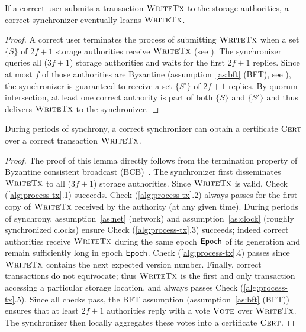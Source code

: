 \begin{lemma}[\tx Availability] \label{th:synchronizer-learns-tx}
    If a correct user submits a transaction $\textsc{WriteTx}$ to the storage authorities, a correct synchronizer eventually learns $\textsc{WriteTx}$.
\end{lemma}
\begin{proof}
    A correct user terminates the process of submitting $\textsc{WriteTx}$ when a set $\{S\}$ of $2f+1$ storage authorities receive $\textsc{WriteTx}$ (see ).
    The synchronizer queries all ($3f+1$) storage authorities and waits for the first $2f+1$ replies. Since at most $f$ of those authorities are Byzantine (assumption~\ref{as:bft} (BFT), see ), the synchronizer is guaranteed to receive a set $\{S'\}$ of $2f+1$ replies.
    By quorum intersection, at least one correct authority is part of both $\{S\}$ and $\{S'\}$ and thus delivers $\textsc{WriteTx}$ to the synchronizer.
\end{proof}

\begin{lemma} \label{th:synchronizer-obtain-cert}
    During periods of synchrony, a correct synchronizer can obtain a certificate $\textsc{Cert}$ over a correct transaction $\textsc{WriteTx}$.
\end{lemma}
\begin{proof}
    The proof of this lemma directly follows from the termination property of Byzantine consistent broadcast (BCB)~\cite{cachin2011introduction}.
    The synchronizer first disseminates $\textsc{WriteTx}$ to all ($3f+1$) storage authorities.
    Since $\textsc{WriteTx}$ is valid, Check (\ref{alg:process-tx}.1) succeeds.
    Check (\ref{alg:process-tx}.2) always passes for the first copy of $\textsc{WriteTx}$ received by the authority (at any given time).
    During periods of synchrony, assumption~\ref{as:net} (network) and assumption~\ref{as:clock} (roughly synchronized clocks) ensure Check (\ref{alg:process-tx}.3) succeeds; indeed correct authorities receive $\textsc{WriteTx}$ during the same epoch $\textsf{Epoch}$ of its generation and remain sufficiently long in epoch $\textsf{Epoch}$.
    Check (\ref{alg:process-tx}.4) passes since $\textsc{WriteTx}$ contains the next expected version number.
    Finally, correct transactions do not equivocate; thus $\textsc{WriteTx}$ is the first and only transaction accessing a particular storage location, and always passes Check (\ref{alg:process-tx}.5).
    Since all checks pass, the BFT assumption (assumption~\ref{as:bft} (BFT)) ensures that at least $2f+1$ authorities reply with a vote $\textsc{Vote}$ over $\textsc{WriteTx}$. The synchronizer then locally aggregates these votes into a certificate $\textsc{Cert}$.
\end{proof}

